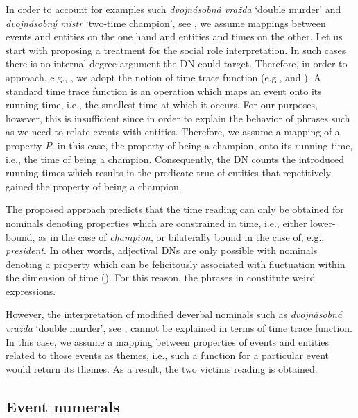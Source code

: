 \documentclass[output=paper,
modfonts,
hidelinks,
newtxmath
]{langscibook}
\begin{document}
In order to account for examples such \textit{dvojnásobná vražda} `double murder' and \textit{dvojnásobný mistr} `two-time champion', see , we assume mappings between events and entities on the one hand and entities and times on the other. Let us start with proposing a treatment for the social role interpretation. In such cases there is no internal degree argument the DN could target. Therefore, in order to approach, e.g., , we adopt the notion of time trace function (e.g., \citealt{krifka_nominal_1989} and \citealt{lasersohn_plurality_1995}). A standard time trace function is an operation which maps an event onto its running time, i.e., the smallest time at which it occurs. For our purposes, however, this is insufficient since in order to explain the behavior of phrases such as  we need to relate events with entities. Therefore, we assume a mapping of a property $P$, in this case, the property of being a champion, onto its running time, i.e., the time of being a champion. Consequently, the DN counts the introduced running times which results in the predicate true of entities that repetitively gained the property of being a champion.

The proposed approach predicts that the time reading can only be obtained for nominals denoting properties which are constrained in time, i.e., either lower-bound, as in the case of \textit{champion}, or bilaterally bound in the case of, e.g., \textit{president}. In other words, adjectival DNs are only possible with nominals denoting a property which can be felicitously associated with fluctuation within the dimension of time (\citealt{wagiel2015multiplicative}). For this reason, the phrases in  constitute weird expressions.

\z

\noindent However, the interpretation of modified deverbal nominals such as \textit{dvojnásobná vražda} `double murder', see , cannot be explained in terms of time trace function. In this case, we assume a mapping between properties of events and entities related to those events as themes, i.e., such a function for a particular event would return its themes. As a result, the two victims reading is obtained.

\subsection{Event numerals}\label{event-numerals}
\end{document}

